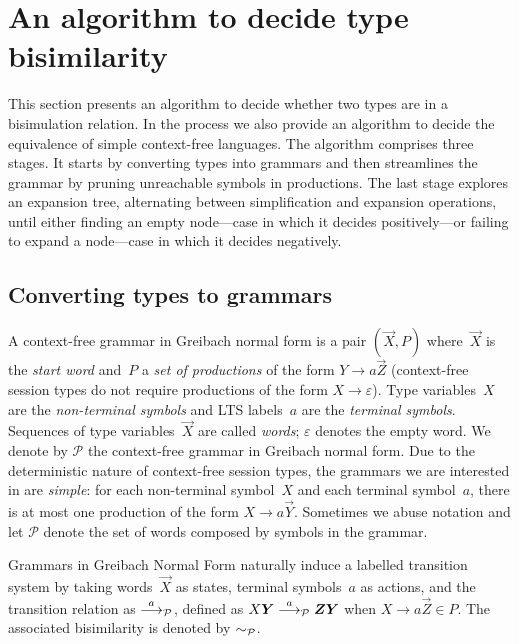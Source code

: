 \section{An algorithm to decide type bisimilarity}
\label{sec:algorithm}



This section presents an algorithm to decide whether two types are in
a bisimulation relation. In the process we also provide an algorithm
to decide the equivalence of simple context-free languages.
%
The algorithm comprises three stages. It
starts by converting types into grammars and then streamlines the
grammar by pruning unreachable symbols in productions. The last stage
explores an expansion tree, alternating between simplification and
expansion operations, until either finding an empty node---case in
which it decides positively---or failing to expand a node---case in
which it decides negatively.

\subsection{Converting types to grammars}
\label{subsec:typeToGrammar}

A context-free grammar in Greibach normal form is a pair $(\vec X,P)$
where~$\vec X$ is the \emph{start word} and~$P$ a \emph{set of
  productions} of the form $Y \rightarrow a\vec Z$ (context-free
session types do not require productions of the form
$X \rightarrow\varepsilon$). Type variables~$X$ are the
\emph{non-terminal symbols} and LTS labels~$a$ are the \emph{terminal
  symbols}. Sequences of type variables~$\vec X$ are called
\emph{words}; $\varepsilon$ denotes the empty word.
%
We denote by $\mathcal{P}$ the context-free grammar in 
Greibach normal form.
%
Due to the deterministic nature of context-free session types, the
grammars we are interested in are \emph{simple}: for each
non-terminal symbol~$X$ and each terminal symbol~$a$, there is at most
one production of the form $X \rightarrow a\vec Y$.
Sometimes we abuse notation and let $\mathcal{P}$ denote the
set of words composed by symbols in the grammar.

Grammars in Greibach Normal Form naturally induce a labelled transition
system by taking words~$\vec X$ as states, terminal
symbols~$a$ as actions, and the transition relation as $\stackrel{a}{\longrightarrow}_\mathcal P$,
defined as $X\vec Y\LTSderivesP \vec Z\vec Y$ when
$X \rightarrow a\vec Z \in P$.
The associated bisimilarity is denoted by $\sim_\mathcal P$.

